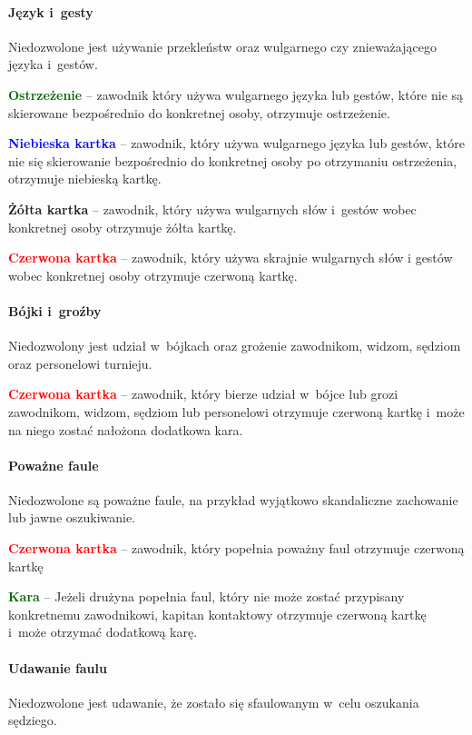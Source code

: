 \documentclass[12pt]{article}
\newcommand\redcard[1]{\bgroup\textcolor{red}{\textbf{#1}}}
\newcommand\yellowcard[1]{\bgroup\textcolor{darkyellow}{\textbf{#1}}}
\newcommand\bluecard[1]{\bgroup\textcolor{blue}{\textbf{#1}}}
\newcommand\other[1]{\bgroup\textcolor{darkgreen}{\textbf{#1}}}
\begin{document}
\paragraph{Język i~gesty}
Niedozwolone jest używanie przekleństw
oraz wulgarnego czy znieważającego języka i~gestów.

\other{Ostrzeżenie} -- zawodnik który używa wulgarnego języka lub gestów,
które nie są skierowane bezpośrednio do konkretnej osoby, otrzymuje
ostrzeżenie.

\bluecard{Niebieska kartka} -- zawodnik, który używa wulgarnego języka lub
gestów, które nie się skierowanie bezpośrednio do konkretnej osoby po
otrzymaniu ostrzeżenia, otrzymuje niebieską kartkę.

\yellowcard{Żółta kartka} -- zawodnik, który używa wulgarnych słów i~gestów
wobec konkretnej osoby otrzymuje żółta kartkę.

\redcard{Czerwona kartka} -- zawodnik, który używa skrajnie wulgarnych słów
i gestów wobec konkretnej osoby otrzymuje czerwoną kartkę.

\paragraph{Bójki i~groźby}
Niedozwolony jest udział w~bójkach
oraz grożenie zawodnikom, widzom, sędziom oraz personelowi turnieju.

\redcard{Czerwona kartka} -- zawodnik, który bierze udział w~bójce lub grozi
zawodnikom, widzom, sędziom lub personelowi otrzymuje czerwoną kartkę i~może na niego zostać nałożona dodatkowa kara.

\paragraph{Poważne faule}
Niedozwolone są poważne faule, na
przykład wyjątkowo skandaliczne zachowanie lub jawne oszukiwanie.

\redcard{Czerwona kartka} -- zawodnik, który popełnia poważny faul otrzymuje
czerwoną kartkę

\other{Kara} -- Jeżeli drużyna popełnia faul, który nie może zostać
przypisany konkretnemu zawodnikowi, kapitan kontaktowy otrzymuje
czerwoną kartkę i~może otrzymać dodatkową karę.

\paragraph{Udawanie faulu}
Niedozwolone jest udawanie, że
zostało się sfaulowanym w~celu oszukania sędziego.
\end{document}
